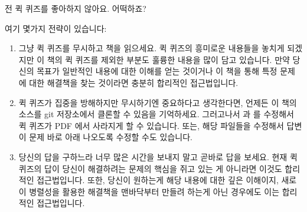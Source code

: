 \QuickQ{}
	전 퀵 퀴즈를 좋아하지 않아요.
	어떡하죠?

\QuickA{}

여기 몇가지 전략이 있습니다:

\begin{enumerate}
\item	그냥 퀵 퀴즈를 무시하고 책을 읽으세요.  퀵 퀴즈의 흥미로운 내용들을
	놓치게 되겠지만 이 책의 퀵 퀴즈를 제외한 부분도 훌륭한 내용을 많이 담고
	있습니다.  만약 당신의 목표가 일반적인 내용에 대한 이해를 얻는 것이거나
	이 책을 통해 특정 문제에 대한 해결책을 찾는 것이라면 충분히 합리적인
	접근법입니다.

\item	퀵 퀴즈가 집중을 방해하지만 무시하기엔 중요하다고 생각한다면, 언제든 이
	책의 소스를 git 저장소에서 클론할 수 있음을 기억하세요.
	그러고나서  과  를 수정해서 퀵 퀴즈가 PDF 에서
	사라지게 할 수 있습니다.
	또는, 해당 파일들을 수정해서 답변이 문제 바로 아래 나오도록 수정할 수도
	있습니다.

\item	당신의 답을 구하느라 너무 많은 시간을 보내지 말고 곧바로 답을 보세요.
	현재 퀵 퀴즈의 답이 당신이 해결하려는 문제의 핵심을 쥐고 있는 게
	아니라면 이것도 합리적인 접근법입니다.  또한, 당신이 원하는게 해당
	내용에 대한 깊은 이해이지, 새로이 병렬성을 활용한 해결책을 맨바닥부터
	만들려 하는게 아닌 경우에도 이는 합리적인 접근법입니다.

\end{enumerate}

